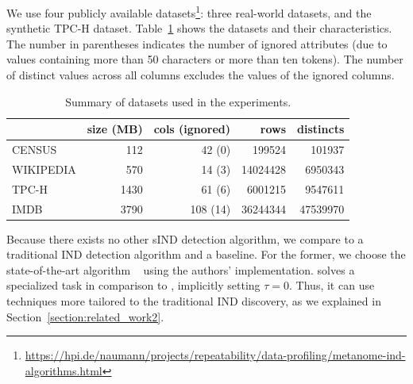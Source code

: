 We use four publicly available datasets\footnote{\url{https://hpi.de/naumann/projects/repeatability/data-profiling/metanome-ind-algorithms.html}}: three real-world datasets, and the synthetic TPC-H dataset.
Table~\ref{table:eval:datasets} shows the datasets and their characteristics.
The number in parentheses indicates the number of ignored attributes (due to values containing more than 50 characters or more than ten tokens).
The number of distinct values across all columns excludes the values of the ignored columns.
\begin{table}[ht]
\centering
\caption{Summary of datasets used in the experiments.}
\label{table:eval:datasets}
\begin{tabular}{@{}lrrrr@{}}
\toprule
     & size (MB)   & cols (ignored)  & rows   & distincts   \\
\midrule
CENSUS    & \num{112}         & 42 \phantom{1}(0)                & \num{199524}    & \num{101937}            \\
WIKIPEDIA & \num{570}         & 14 \phantom{1}(3)                & \num{14024428}  & \num{6950343}           \\
TPC-H    & \num{1430}        & 61 \phantom{1}(6)                & \num{6001215}   & \num{9547611}           \\
IMDB      & \num{3790}        & 108 (14)              & \num{36244344}  & \num{47539970}          \\
\bottomrule
\end{tabular}
\end{table}



Because there exists no other sIND detection algorithm, we compare \sawfish to a traditional IND detection algorithm and a baseline.
For the former, we choose the state-of-the-art algorithm ~\cite{papenbrock2015divide} using the authors' implementation.
 solves a specialized task in comparison to \sawfish, implicitly setting $\tau = 0$. Thus, it can use techniques more tailored to the traditional IND discovery, as we explained in Section~\ref{section:related_work2}.

